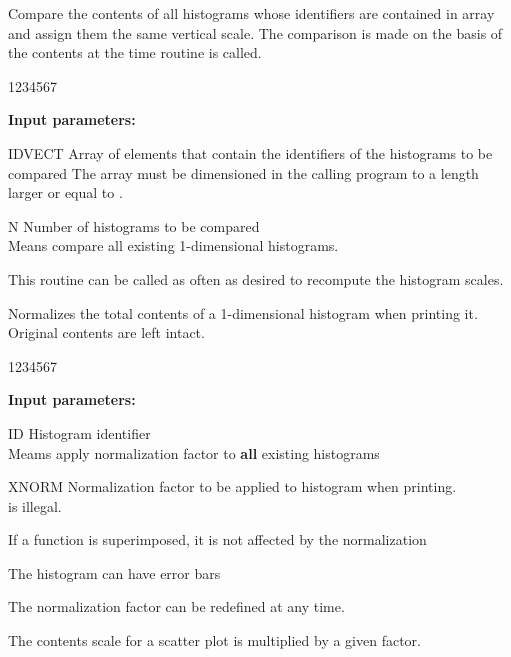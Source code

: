 \Action
Compare the contents of all histograms whose identifiers are
contained in array  and assign them
the same vertical scale.
The comparison is made on the basis of the contents at the
time routine is called.
 
\begin{DLtt}{1234567}
\item[{\rm\bf Input parameters:}]
\item[IDVECT] Array of  elements that contain the identifiers
of the histograms to be compared
The array must be dimensioned in the calling program
to a length larger or equal to .
\item[N] Number of histograms to be compared\\
 Means compare all existing 1-dimensional histograms.
\end{DLtt}
 
\Remark
 
This routine can be called as often as desired to recompute the
histogram scales.
 
 
\Action
Normalizes the total contents of a 1-dimensional histogram
when printing it. Original contents are left intact.
 
\begin{DLtt}{1234567}
\item[{\rm\bf Input parameters:}]
\item[ID] Histogram identifier\\
 Meams apply normalization factor
to {\bf all} existing histograms
\item[XNORM] Normalization factor to be applied to histogram
when printing. \\
 is illegal.
\end{DLtt}
 
\Remark
 
\begin{UL}
\item If a function is superimposed,
it is not affected by the normalization
\item The histogram can have error bars
\item The normalization factor can be redefined at any time.
\end{UL}
 
 
\Action
The contents scale for a scatter plot is multiplied by a given factor.
 
